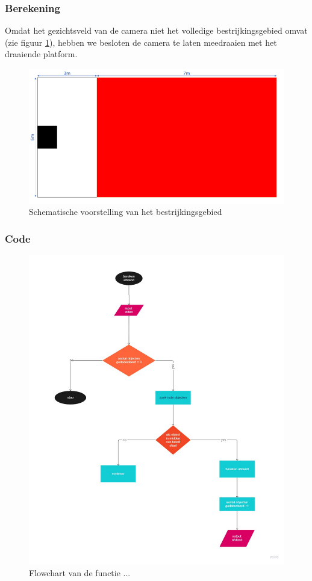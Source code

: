 \documentclass[kulak]{kulakarticle} %
\begin{document}
\subsubsection{Berekening}
Omdat het gezichtsveld van de camera niet het volledige bestrijkingsgebied omvat (zie figuur \ref{bestrijkingsgebied}), hebben we besloten de camera te laten meedraaien met het draaiende platform. 
\begin{figure} [h!]
	\centering
	\includegraphics[width = .75 \textwidth]{schematische voorstelling bestrijkingsgebied LATEX}
	\caption{Schematische voorstelling van het bestrijkingsgebied}
	\label{bestrijkingsgebied}
\end{figure}

\subsubsection{Code}

\begin{figure}
	\centering
	\includegraphics[width = 0.8 \textwidth]{flowchart afstand berekenen.pdf}
	\caption{Flowchart van de functie ...}
\end{figure}
 
\end{document}
